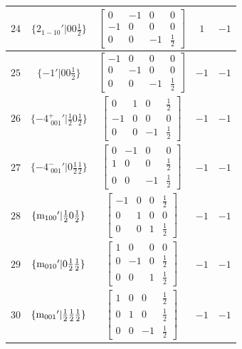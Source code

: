 \documentclass[fleqn,8pt]{jsarticle}
\begin{document}
\begin{longtable}{ccccc}
$ 24 $ & $ \{2{}_{1-10}{}'|0 0 \frac{1}{2}\} $ & $ \begin{bmatrix} 0 & -1 & 0 & 0 \\ -1 & 0 & 0 & 0 \\ 0 & 0 & -1 & \frac{1}{2} \end{bmatrix} $ & $ 1 $ & $ -1 $ \\ \hline
$ 25 $ & $ \{-1{}'|0 0 \frac{1}{2}\} $ & $ \begin{bmatrix} -1 & 0 & 0 & 0 \\ 0 & -1 & 0 & 0 \\ 0 & 0 & -1 & \frac{1}{2} \end{bmatrix} $ & $ -1 $ & $ -1 $ \\ \hline
$ 26 $ & $ \{-4^{+}_{\,\,001}{}'|\frac{1}{2} 0 \frac{1}{2}\} $ & $ \begin{bmatrix} 0 & 1 & 0 & \frac{1}{2} \\ -1 & 0 & 0 & 0 \\ 0 & 0 & -1 & \frac{1}{2} \end{bmatrix} $ & $ -1 $ & $ -1 $ \\ \hline
$ 27 $ & $ \{-4^{-}_{\,\,001}{}'|0 \frac{1}{2} \frac{1}{2}\} $ & $ \begin{bmatrix} 0 & -1 & 0 & 0 \\ 1 & 0 & 0 & \frac{1}{2} \\ 0 & 0 & -1 & \frac{1}{2} \end{bmatrix} $ & $ -1 $ & $ -1 $ \\ \hline
$ 28 $ & $ \{{\rm m}_{100}{}'|\frac{1}{2} 0 \frac{1}{2}\} $ & $ \begin{bmatrix} -1 & 0 & 0 & \frac{1}{2} \\ 0 & 1 & 0 & 0 \\ 0 & 0 & 1 & \frac{1}{2} \end{bmatrix} $ & $ -1 $ & $ -1 $ \\ \hline
$ 29 $ & $ \{{\rm m}_{010}{}'|0 \frac{1}{2} \frac{1}{2}\} $ & $ \begin{bmatrix} 1 & 0 & 0 & 0 \\ 0 & -1 & 0 & \frac{1}{2} \\ 0 & 0 & 1 & \frac{1}{2} \end{bmatrix} $ & $ -1 $ & $ -1 $ \\ \hline
$ 30 $ & $ \{{\rm m}_{001}{}'|\frac{1}{2} \frac{1}{2} \frac{1}{2}\} $ & $ \begin{bmatrix} 1 & 0 & 0 & \frac{1}{2} \\ 0 & 1 & 0 & \frac{1}{2} \\ 0 & 0 & -1 & \frac{1}{2} \end{bmatrix} $ & $ -1 $ & $ -1 $ \\ \hline

\end{longtable}
\end{document}
